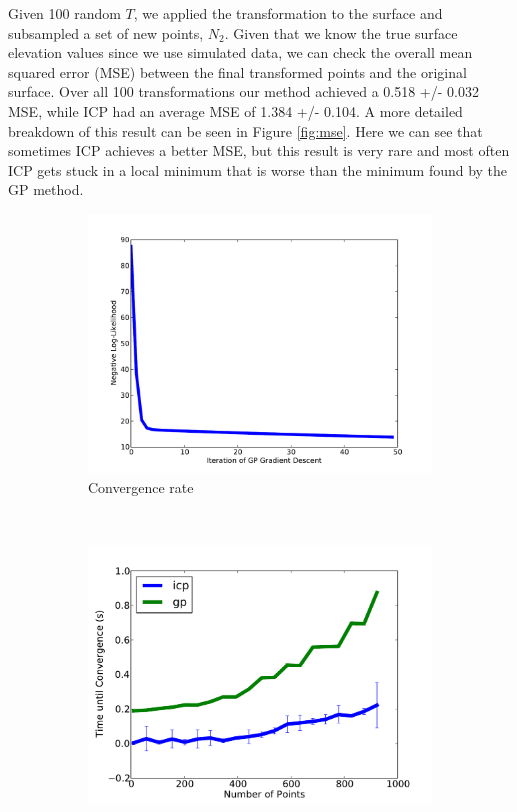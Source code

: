 \documentclass{article} %
\begin{document}
Given 100 random $T$, we applied the transformation to the surface and subsampled a set of new points, $N_2$. Given that we know the true surface elevation values since we use simulated data, we can check the overall mean squared error (MSE) between the final transformed points and the original surface. Over all 100 transformations our method achieved a 0.518 +/- 0.032 MSE, while ICP had an average MSE of 1.384 +/- 0.104. A more detailed breakdown of this result can be seen in Figure \ref{fig:mse}. Here we can see that sometimes ICP achieves a better MSE, but this result is very rare and most often ICP gets stuck in a local minimum that is worse than the minimum found by the GP method.


\begin{figure}[h!]
        \centering
        \begin{subfigure}[b]{0.5\textwidth}
                \centering
                \includegraphics[width=\textwidth]{LL.pdf}
                \caption{Convergence rate }
                \label{fig:convergence}
        \end{subfigure}%
        ~ %
        \begin{subfigure}[b]{0.5\textwidth}
                \centering
                \includegraphics[width=\textwidth]{scaling3.pdf}

\end{subfigure}
\end{figure}
\end{document}
